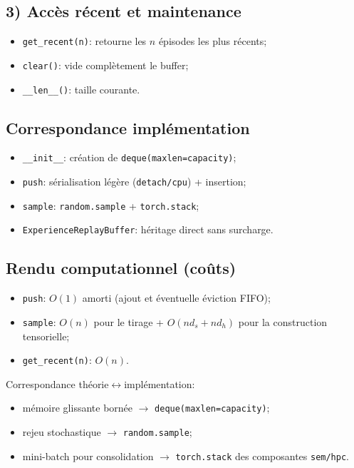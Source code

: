 \documentclass[12pt,a4paper]{article}
\begin{document}
\subsection{3) Accès récent et maintenance}
\begin{itemize}
    \item \texttt{get\_recent(n)}: retourne les $n$ épisodes les plus récents;
    \item \texttt{clear()}: vide complètement le buffer;
    \item \texttt{\_\_len\_\_()}: taille courante.
\end{itemize}

\subsection{Correspondance implémentation}
\begin{itemize}
    \item \texttt{\_\_init\_\_}: création de \texttt{deque(maxlen=capacity)};
    \item \texttt{push}: sérialisation légère (\texttt{detach/cpu}) + insertion;
    \item \texttt{sample}: \texttt{random.sample} + \texttt{torch.stack};
    \item \texttt{ExperienceReplayBuffer}: héritage direct sans surcharge.
\end{itemize}

\subsection{Rendu computationnel (coûts)}
\begin{itemize}
    \item \texttt{push}: $O(1)$ amorti (ajout et éventuelle éviction FIFO);
    \item \texttt{sample}: $O(n)$ pour le tirage + $O(n d_s + n d_h)$ pour la construction tensorielle;
    \item \texttt{get\_recent(n)}: $O(n)$.
\end{itemize}

Correspondance théorie$\leftrightarrow$implémentation:
\begin{itemize}
    \item mémoire glissante bornée $\rightarrow$ \texttt{deque(maxlen=capacity)};
    \item rejeu stochastique $\rightarrow$ \texttt{random.sample};
    \item mini-batch pour consolidation $\rightarrow$ \texttt{torch.stack} des composantes \texttt{sem/hpc}.
\end{itemize}
\end{document}
